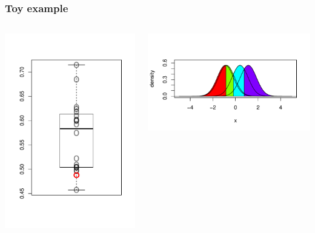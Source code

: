 \documentclass{beamer}
\begin{document}
\begin{frame}
\frametitle{Toy example}
\begin{columns}
\begin{column}{0.5\textwidth}
\includegraphics[scale = 0.5]{../extrapolation/autoplots/box4_2.pdf}
\end{column}
\begin{column}{0.5\textwidth}
\includegraphics[scale = 0.5]{../extrapolation/autoplots/dens4_2.pdf}
\end{column}
\end{columns}
\end{frame}
\end{document}
